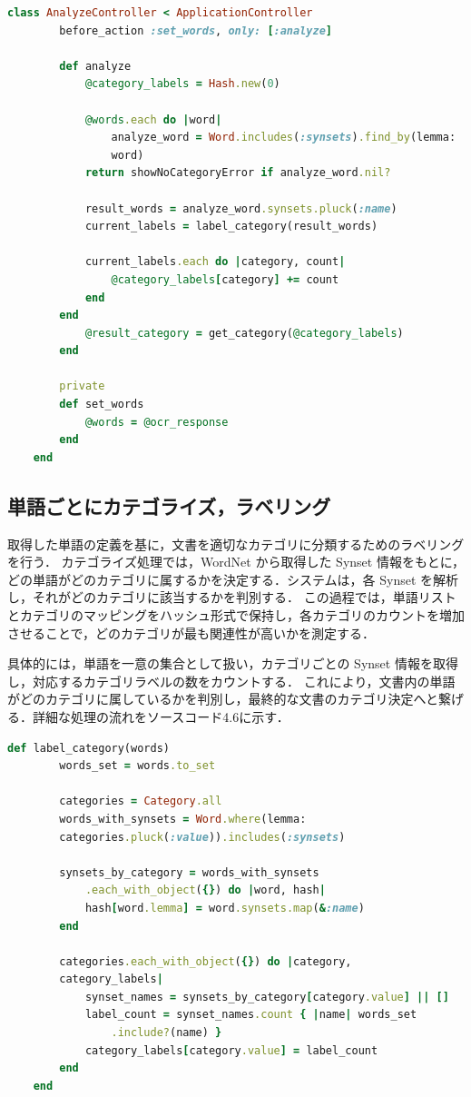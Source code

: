 \begin{lstlisting}[language=Ruby, caption=ActiveRecord による WordNet との連携]
    class AnalyzeController < ApplicationController
        before_action :set_words, only: [:analyze]

        def analyze
            @category_labels = Hash.new(0)

            @words.each do |word|
                analyze_word = Word.includes(:synsets).find_by(lemma:
                word)
            return showNoCategoryError if analyze_word.nil?

            result_words = analyze_word.synsets.pluck(:name)
            current_labels = label_category(result_words)

            current_labels.each do |category, count|
                @category_labels[category] += count
            end
        end
            @result_category = get_category(@category_labels)
        end

        private
        def set_words
            @words = @ocr_response
        end
    end
\end{lstlisting}

\clearpage

\subsection{単語ごとにカテゴライズ，ラベリング}
\label{subsec:app_categolize}

取得した単語の定義を基に，文書を適切なカテゴリに分類するためのラベリングを行う．
カテゴライズ処理では，WordNet から取得した Synset 情報をもとに，どの単語がどのカテゴリに属するかを決定する．システムは，各 Synset を解析し，それがどのカテゴリに該当するかを判別する．
この過程では，単語リストとカテゴリのマッピングをハッシュ形式で保持し，各カテゴリのカウントを増加させることで，どのカテゴリが最も関連性が高いかを測定する．

具体的には，単語を一意の集合として扱い，カテゴリごとの Synset 情報を取得し，対応するカテゴリラベルの数をカウントする．
これにより，文書内の単語がどのカテゴリに属しているかを判別し，最終的な文書のカテゴリ決定へと繋げる．詳細な処理の流れをソースコード4.6に示す．

\begin{lstlisting}[language=Ruby, caption=カテゴリのラベリングメソッド]
    def label_category(words)
        words_set = words.to_set

        categories = Category.all
        words_with_synsets = Word.where(lemma:
        categories.pluck(:value)).includes(:synsets)

        synsets_by_category = words_with_synsets
            .each_with_object({}) do |word, hash|
            hash[word.lemma] = word.synsets.map(&:name)
        end

        categories.each_with_object({}) do |category,
        category_labels|
            synset_names = synsets_by_category[category.value] || []
            label_count = synset_names.count { |name| words_set
                .include?(name) }
            category_labels[category.value] = label_count
        end
    end
\end{lstlisting}

